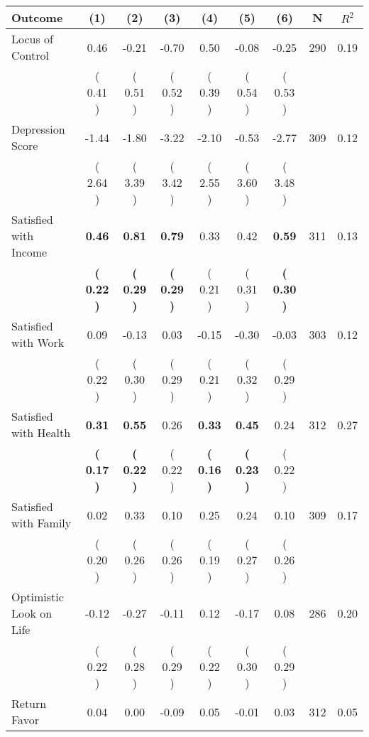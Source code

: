 \begin{tabular}{lcccccccc}
\toprule
 \textbf{Outcome} & \textbf{(1)} & \textbf{(2)} & \textbf{(3)} & \textbf{(4)} & \textbf{(5)} & \textbf{(6)} & \textbf{N} & \textbf{$ R^2$} \\
\midrule
Locus of Control &      0.46 &     -0.21 &     -0.70 &      0.50 &     -0.08 &     -0.25 & 290 &       0.19 \\ 
 & (     0.41 ) & (     0.51 ) & (     0.52 ) & (     0.39 ) & (     0.54 ) & (     0.53 ) & \\
Depression Score &     -1.44 &     -1.80 &     -3.22 &     -2.10 &     -0.53 &     -2.77 & 309 &       0.12 \\ 
 & (     2.64 ) & (     3.39 ) & (     3.42 ) & (     2.55 ) & (     3.60 ) & (     3.48 ) & \\
Satisfied with Income & \textbf{     0.46} & \textbf{     0.81} & \textbf{     0.79} &      0.33 &      0.42 & \textbf{     0.59} & 311 &       0.13 \\ 
 & \textbf{(     0.22 )} & \textbf{(     0.29 )} & \textbf{(     0.29 )} & (     0.21 ) & (     0.31 ) & \textbf{(     0.30 )} & \\
Satisfied with Work &      0.09 &     -0.13 &      0.03 &     -0.15 &     -0.30 &     -0.03 & 303 &       0.12 \\ 
 & (     0.22 ) & (     0.30 ) & (     0.29 ) & (     0.21 ) & (     0.32 ) & (     0.29 ) & \\
Satisfied with Health & \textbf{     0.31} & \textbf{     0.55} &      0.26 & \textbf{     0.33} & \textbf{     0.45} &      0.24 & 312 &       0.27 \\ 
 & \textbf{(     0.17 )} & \textbf{(     0.22 )} & (     0.22 ) & \textbf{(     0.16 )} & \textbf{(     0.23 )} & (     0.22 ) & \\
Satisfied with Family &      0.02 &      0.33 &      0.10 &      0.25 &      0.24 &      0.10 & 309 &       0.17 \\ 
 & (     0.20 ) & (     0.26 ) & (     0.26 ) & (     0.19 ) & (     0.27 ) & (     0.26 ) & \\
Optimistic Look on Life &     -0.12 &     -0.27 &     -0.11 &      0.12 &     -0.17 &      0.08 & 286 &       0.20 \\ 
 & (     0.22 ) & (     0.28 ) & (     0.29 ) & (     0.22 ) & (     0.30 ) & (     0.29 ) & \\
Return Favor &      0.04 &      0.00 &     -0.09 &      0.05 &     -0.01 &      0.03 & 312 &       0.05 \\ 

\end{tabular}
